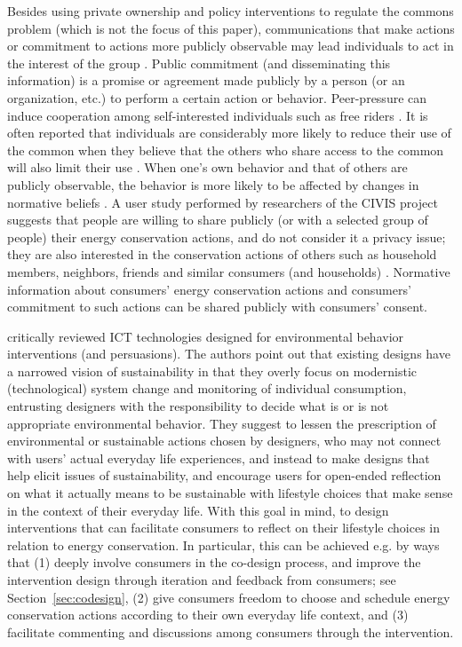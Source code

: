 \documentclass[a4paper,10pt]{article}
\begin{document}
Besides using private ownership and policy interventions to regulate the commons problem (which is not the focus of this paper), communications that make actions or commitment to actions more publicly observable may lead individuals to act in the interest of the group \citep{Edney1978,Schultz2002}. Public commitment (and disseminating this information) \citep{mckenzie2000fostering,Abrahamse2005} is a promise or agreement made publicly by a person (or an organization, etc.) to perform a certain action or behavior. Peer-pressure can induce cooperation among self-interested individuals such as free riders \citep{mani2013inducing}. It is often reported that individuals are considerably more likely to reduce their use of the common when they believe that the others who share access to the common will also limit their use \citep{Edney1978,Schultz2002}. When one's own behavior and that of others are publicly observable, the behavior is more likely to be affected by changes in normative beliefs \citep{yim2011tale,Schultz2002}. A user study performed by researchers of the CIVIS project suggests that people are willing to share publicly (or with a selected group of people) their energy conservation actions, and do not consider it a privacy issue; they are also interested in the conservation actions of others such as household members, neighbors, friends and similar consumers (and households) \citep{Barssi2015}. Normative information about consumers' energy conservation actions and consumers' commitment to such actions can be shared publicly with consumers' consent.

\citet{Brynjarsdottir2012} critically reviewed ICT technologies designed for environmental behavior interventions (and persuasions). The authors point out that existing designs have a narrowed vision of sustainability in that they overly focus on modernistic (technological) system change and monitoring of individual consumption, entrusting designers with the responsibility to decide what is or is not appropriate environmental behavior. They suggest to lessen the prescription of environmental or sustainable actions chosen by designers, who may not connect with users' actual everyday life experiences, and instead to make designs that help elicit issues of sustainability, and encourage users for open-ended reflection on what it actually means to be sustainable with lifestyle choices that make sense in the context of their everyday life. With this goal in mind, to design interventions that can facilitate consumers to reflect on their lifestyle choices in relation to energy conservation. In particular, this can be achieved e.g. by ways that (1) deeply involve consumers in the co-design process, and improve the intervention design through iteration and feedback from consumers; see Section~\ref{sec:codesign}, (2) give consumers freedom to choose and schedule energy conservation actions according to their own everyday life context, and (3) facilitate commenting and discussions among consumers through the intervention.
\end{document}
